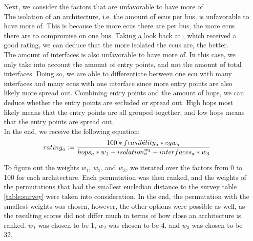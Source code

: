 Next, we consider the factors that are unfavorable to have more of.\\
The isolation of an architecture, i.e. the amount of \acrshort{ecu}s per bus, is unfavorable to have more of.
This is because the more \acrshort{ecu}s there are per bus, the more \acrshort{ecu}s there are to compromise on one bus.
Taking a look back at , which received a good rating, we can deduce that the more isolated the \acrshort{ecu}s are, the better.\\
The amount of interfaces is also unfavorable to have more of.
In this case, we only take into account the amount of entry points, and not the amount of total interfaces.
Doing so, we are able to differentiate between one \acrshort{ecu} with many interfaces and many \acrshort{ecu}s with one interface since more entry points are also likely more spread out.
Combining entry points and the amount of hops, we can deduce whether the entry points are secluded or spread out.
High hops most likely means that the entry points are all grouped together, and low hops means that the entry points are spread out.\\

In the end, we receive the following equation:\\
\begin{equation}
    rating_{a} := \frac{100 * feasibility_{a} * cgw_{a}}{hops_{a}*w_{1} + isolation_{a}^{w_{2}} + interfaces_{a}*w_{3}} \label{eq:rating}\\\\
\end{equation}

\hfill \break

To figure out the weights $w_{1}$, $w_{2}$, and $w_{3}$, we iterated over the factors from 0 to 100 for each architecture.
Each permutation was then ranked, and the weights of the permutations that had the smallest eucledian distance to the survey table \ref{table:survey} were taken into consideration.
In the end, the permutation with the smallest weights was chosen, however, the other options were possible as well, 
as the resulting scores did not differ much in terms of how close an architecture is ranked.
$w_{1}$ was chosen to be 1, $w_{2}$ was chosen to be 4, and $w_{3}$ was chosen to be 32.\\

